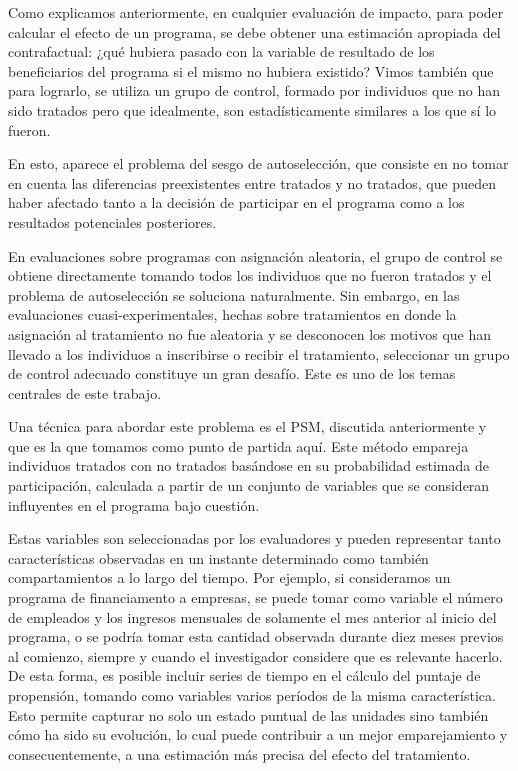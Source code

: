 \documentclass[../main.tex]{subfiles}
\begin{document}
Como explicamos anteriormente, en cualquier evaluación de impacto, para poder calcular el
efecto de un programa, se debe obtener una estimación apropiada del contrafactual: ¿qué
hubiera pasado con la variable de resultado de los beneficiarios del programa si el mismo
no hubiera existido? Vimos también que para lograrlo, se utiliza un grupo de control,
formado por individuos que no han sido tratados pero que idealmente, son estadísticamente
similares a los que sí lo fueron.

En esto, aparece el problema del sesgo de autoselección, que consiste en no tomar en
cuenta las diferencias preexistentes entre tratados y no tratados, que pueden haber
afectado tanto a la decisión de participar en el programa como a los resultados
potenciales posteriores.

En evaluaciones sobre programas con asignación aleatoria, el grupo de control se obtiene
directamente tomando todos los individuos que no fueron tratados y el problema de
autoselección se soluciona naturalmente. Sin embargo, en las evaluaciones
cuasi-experimentales, hechas sobre tratamientos en donde la asignación al tratamiento no
fue aleatoria y se desconocen los motivos que han llevado a los individuos a inscribirse o
recibir el tratamiento, seleccionar un grupo de control adecuado constituye un gran
desafío. Este es uno de los temas centrales de este trabajo.

Una técnica para abordar este problema es el PSM, discutida anteriormente y que es la que
tomamos como punto de partida aquí. Este método empareja individuos tratados con no
tratados basándose en su probabilidad estimada de participación, calculada a partir de un
conjunto de variables que se consideran influyentes en el programa bajo cuestión.

Estas variables son seleccionadas por los evaluadores y pueden representar tanto
características observadas en un instante determinado como también compartamientos a lo
largo del tiempo. Por ejemplo, si consideramos un programa de financiamento a empresas, se
puede tomar como variable el número de empleados y los ingresos mensuales de solamente el
mes anterior al inicio del programa, o se podría tomar esta cantidad observada durante
diez meses previos al comienzo, siempre y cuando el investigador considere que es
relevante hacerlo. De esta forma, es posible incluir series de tiempo en el cálculo del
puntaje de propensión, tomando como variables varios períodos de la misma característica.
Esto permite capturar no solo un estado puntual de las unidades sino también cómo ha sido
su evolución, lo cual puede contribuir a un mejor emparejamiento y consecuentemente, a una
estimación más precisa del efecto del tratamiento.
\end{document}
